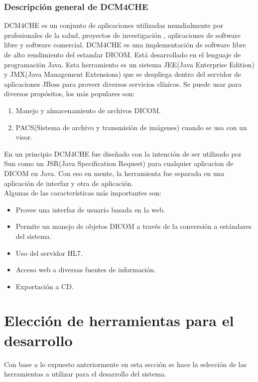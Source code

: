 \documentclass[12pt]{report}
\begin{document}
\subsubsection{Descripción general de DCM4CHE}
DCM4CHE es un conjunto de aplicaciones  utilizadas mundialmente por profesionales de la salud, proyectos de investigación , aplicaciones de software libre y software comercial. DCM4CHE es una implementación de software libre de alto rendimiento del estandar DICOM. Está desarrollado en el lenguaje de programación Java. Esta herramiento es un sistema JEE(Java Enterprise Edition) y JMX(Java Management Extensions) que se despliega dentro del servidor de aplicaciones JBoss para proveer diversos servicios clínicos. Se puede usar para diversos propósitos, los más populares son:
\begin{enumerate}
\item Manejo y almacenamiento de archivos DICOM.
\item PACS(Sistema de archivo y transmisión de imágenes) cuando se usa con un visor.
\end{enumerate}
En un principio DCM4CHE fue diseñado con la intención de ser utilizado por Sun como un JSR(Java Specification Request) para cualquier aplicacion de DICOM en Java. Con eso en mente, la herramienta fue separada en una aplicación de interfaz y otra de aplicación.\cite{dcm}\\
Algunas de las características más importantes son:
\begin{itemize}
\item Provee una interfaz de usuario basada en la web.
\item Permite un manejo de objetos DICOM a través de la conversión a estándares del sistema. 
\item Uso del servidor HL7.
\item Acceso web a diversas fuentes de información. 
\item Exportación a CD.
\end{itemize}

\section{Elección de herramientas para el desarrollo}
Con base a lo expuesto anteriormente en esta sección se hace la selección de las herramientas a utilizar para el desarrollo del sistema.\\
\end{document}
